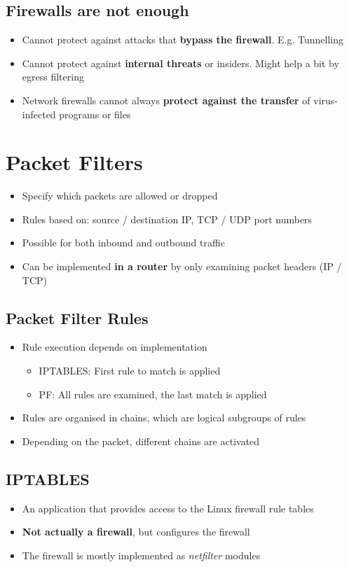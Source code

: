 \documentclass{article}
\begin{document}
\subsection{Firewalls are not enough}
\begin{itemize}
  \item Cannot protect against attacks that \textbf{bypass the firewall}. E.g. Tunnelling 
  \item Cannot protect against \textbf{internal threats} or insiders. Might help a bit by egress filtering 
  \item Network firewalls cannot always \textbf{protect against the transfer} of virus-infected programs or files
\end{itemize}

\section{Packet Filters}
\begin{itemize}
  \item Specify which packets are allowed or dropped 
  \item Rules based on: source / destination IP, TCP / UDP port numbers 
  \item Possible for both inbound and outbound traffic 
  \item Can be implemented \textbf{in a router} by only examining packet headers (IP / TCP)
\end{itemize}

\subsection{Packet Filter Rules}
\begin{itemize}
  \item Rule execution depends on implementation 
  \begin{itemize}
    \item IPTABLES: First rule to match is applied 
    \item PF: All rules are examined, the last match is applied 
  \end{itemize}
  \item Rules are organised in chains, which are logical subgroups of rules 
  \item Depending on the packet, different chains are activated
\end{itemize}

\subsection{IPTABLES}
\begin{itemize}
  \item An application that provides access to the Linux firewall rule tables 
  \item \textbf{Not actually a firewall}, but configures the firewall 
  \item The firewall is mostly implemented as \textit{netfilter} modules
\end{itemize}
\end{document}
